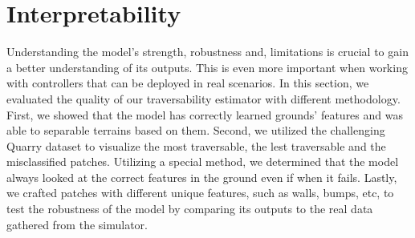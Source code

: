 \documentclass[../document.tex]{subfiles}
\begin{document}
\chapter{Interpretability}
\label{chap: interpretability}
Understanding the model's strength, robustness and, limitations is crucial to gain a better understanding of its outputs. This is even more important when working with controllers that can be deployed in real scenarios. In this section, we evaluated the quality of our traversability estimator with different methodology. First, we showed that the model has correctly learned grounds' features and was able to separable terrains based on them. Second, we utilized the challenging Quarry dataset to visualize the most traversable, the lest traversable and the misclassified patches.  Utilizing a special method, we determined that the model always looked at the correct features in the ground even if when it fails. Lastly, we crafted patches with different unique features, such as walls, bumps, etc, to test the robustness of the model by comparing its outputs to the real data gathered from the simulator. 
\end{document}
